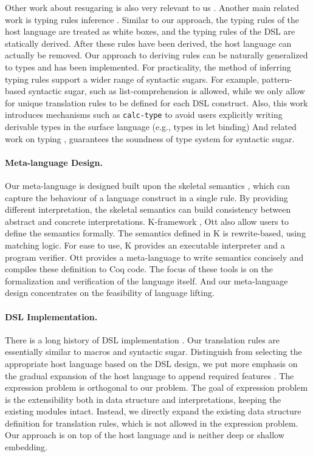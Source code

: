 Other work about resugaring is also very relevant to us \cite{infer-scope,lazy-desg}.
Another main related work is typing rules inference \cite{infer-types}.
Similar to our approach, the typing rules of the host language are treated as white boxes, and the typing rules of the DSL are statically derived.
After these rules have been derived, the host language can actually be removed.
Our approach to deriving rules can be naturally generalized to types and has been implemented.
For practicality, the method of inferring typing rules support a wider range of syntactic sugars.
For example, pattern-based syntactic sugar, such as list-comprehension is allowed,
 while we only allow for unique translation rules to be defined for each DSL construct.
Also, this work introduces mechanisms such as \texttt{calc-type} to avoid users explicitly writing derivable types in the surface language (e.g., types in let binding)
And related work on typing \cite{type-sound,type-sound-1}, guarantees the soundness of type system for syntactic sugar.

\paragraph{Meta-language Design.}
Our meta-language is designed built upon the skeletal semantics \cite{skeleton},
 which can capture the behaviour of a language construct in a single rule.
By providing different interpretation,
 the skeletal semantics can build consistency between abstract and concrete interpretations.
K-framework \cite{K-framework}, Ott \cite{Ott} also allow users to define the semantics formally.
The semantics defined in K is rewrite-based, using matching logic.
For ease to use, K provides an executable interpreter and a program verifier.
Ott provides a meta-language to write semantics concisely and compiles these definition to Coq code.
The focus of these tools is on the formalization and verification of the language itself.
And our meta-language design concentrates on the feasibility of language lifting.

\paragraph{DSL Implementation.}
There is a long history of DSL implementation \cite{MartinDSL,when-how-dsl}.
Our translation rules are essentially similar to macros and syntactic sugar.
Distinguish from selecting the appropriate host language based on the DSL design,
 we put more emphasis on the gradual expansion of the host language to append required features \cite{MoggiMeta}.
The expression problem \cite{expr-problem} is orthogonal to our problem.
The goal of expression problem is the extensibility both in data structure and interpretations,
 keeping the existing modules intact.
Instead, we directly expand the existing data structure definition for translation rules,
 which is not allowed in the expression problem.
Our approach is on top of the host language and is neither deep or shallow embedding.

